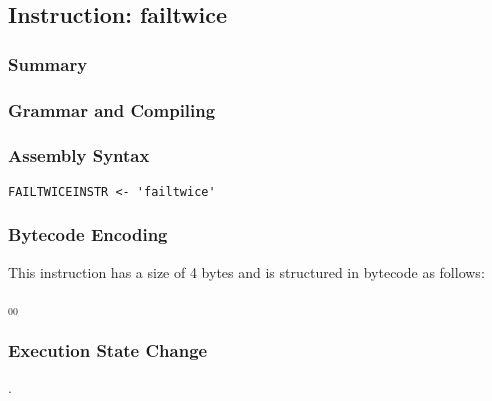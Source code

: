 \subsection{Instruction: failtwice}

\subsubsection{Summary}


\subsubsection{Grammar and Compiling}


\subsubsection{Assembly Syntax}

\begin{myquote}
\begin{verbatim}
FAILTWICEINSTR <- 'failtwice'
\end{verbatim}
\end{myquote}


\subsubsection{Bytecode Encoding}

This instruction has a size of 4 bytes and is structured in bytecode as follows:

$_{00}$\ 


\subsubsection{Execution State Change}

.



